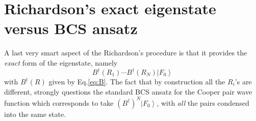 \documentclass[aps,prb,superscriptaddress,twocolumn]{revtex4}
\begin{document}

\section{Richardson's exact eigenstate versus BCS ansatz \label{sec:conn}}

A last very smart aspect of the Richardson's procedure is that it provides the 
\emph{exact} form of the eigenstate, namely 
\begin{equation}
B^{\dagger}(R_1)\cdots{}B^{\dagger}(R_N)\left|F_0\right>  
\end{equation}
with $B^{\dagger}(R)$ given by Eq.\eqref{eq:B}. The fact that by
construction all the $R_i$'s are different, strongly questions the standard
BCS ansatz for the Cooper pair wave function which corresponds to take $\left(B^{\dagger}\right)
^N\left|F_0\right> $, with \emph{all} the pairs condensed into the same
state.
\end{document}
